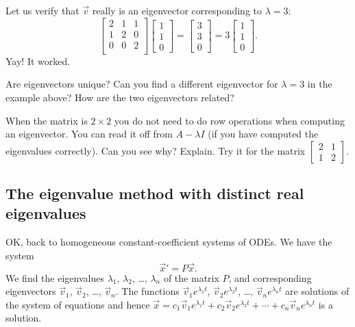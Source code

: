 \begin{example}
Let us verify that $\vec{v}$ really is an eigenvector corresponding to $\lambda = 3$:
\begin{equation*}
\begin{bmatrix}
2 & 1 & 1 \\
1 & 2 & 0 \\
0 & 0 & 2 \\
\end{bmatrix}
\begin{bmatrix}
1 \\
1 \\
0
\end{bmatrix}
=
\begin{bmatrix}
3 \\
3 \\
0
\end{bmatrix}
=
3
\begin{bmatrix}
1 \\
1 \\
0
\end{bmatrix} .
\end{equation*}
Yay!  It worked.
\end{example}

\begin{exercise}[easy]
Are eigenvectors unique?  Can you find a different eigenvector for
$\lambda = 3$ in the example above?  How are the two eigenvectors related?
\end{exercise}

\begin{exercise}
When the matrix is $2 \times 2$ you do not need to
do row operations when computing an eigenvector.
You can read it off from $A-\lambda I$
(if you have computed the eigenvalues correctly).
Can you see why?  Explain.  Try it for the matrix
$\left[ \begin{smallmatrix} 2 & 1 \\ 1 & 2 \end{smallmatrix} \right]$.
\end{exercise}

\subsection{The eigenvalue method with distinct real eigenvalues}

OK\@, back to homogeneous constant-coefficient systems of ODEs.  We have the system
\begin{equation*}
{\vec{x}}' = P\vec{x} .
\end{equation*}
We find the eigenvalues $\lambda_1$, $\lambda_2$, \ldots, $\lambda_n$
of the matrix $P$, and corresponding eigenvectors
$\vec{v}_1$, $\vec{v}_2$, \ldots, $\vec{v}_n$.
The functions
$\vec{v}_1 e^{\lambda_1 t}$, 
$\vec{v}_2 e^{\lambda_2 t}$, \ldots,
$\vec{v}_n e^{\lambda_n t}$ are solutions of the system of equations and hence
$
\vec{x} = c_1 \vec{v}_1 e^{\lambda_1 t} +
c_2 \vec{v}_2 e^{\lambda_2 t} + \cdots +
c_n \vec{v}_n e^{\lambda_n t}
$
is a solution.

